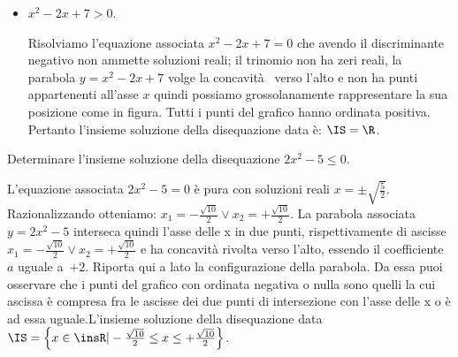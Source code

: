 \begin{esempio}
\begin{itemize}
\item $x^2-2x+7>0$.

\begin{minipage}{.76\linewidth}
Risolviamo l'equazione associata $x^2-2x+7=0$ che avendo il discriminante 
negativo non ammette soluzioni reali; il trinomio non ha zeri reali, la 
parabola 
$y=x^2-2x+7$ volge la concavità  verso l'alto e non ha punti appartenenti 
all'asse $x$ quindi possiamo grossolanamente rappresentare la sua posizione  
come in figura. Tutti i punti del grafico hanno ordinata positiva. Pertanto 
l'insieme soluzione della disequazione data è: $\IS=\R$.
\end{minipage}
\hfill
\begin{minipage}{.22\linewidth}
 \parabolac
\end{minipage}

\end{itemize}

%  
% 

\end{esempio}

% 
% 
% 

\begin{esempio}
Determinare l'insieme soluzione della disequazione $2x^2-5\le 0$.

L'equazione associata $2x^2-5=0$ è pura con soluzioni reali $x=\pm 
\sqrt{\frac 
5 2}$. Razionalizzando otteniamo: $x_1=-\frac{\sqrt{10}} 2\vee 
x_2=+\frac{\sqrt{10}} 2$. La parabola associata $y=2x^2-5$ interseca quindi 
l'asse delle x in due punti, rispettivamente di ascisse 
$x_1=-\frac{\sqrt{10}} 2\vee x_2=+\frac{\sqrt{10}} 2$ 
e ha concavità rivolta verso l'alto, essendo il coefficiente~$a$ uguale 
a~$+2$.
Riporta qui a lato la configurazione della parabola.
Da essa puoi osservare che i punti del grafico con ordinata negativa o nulla 
sono quelli la cui ascissa è compresa fra le ascisse dei due punti di 
intersezione con l'asse delle x o è ad essa uguale.L'insieme soluzione della 
disequazione data 
 $\IS=\left\{x\in \insR | -\frac{\sqrt{10}} 2\le x\le +\frac{\sqrt{10}} 
2\right\}$.
\end{esempio}


